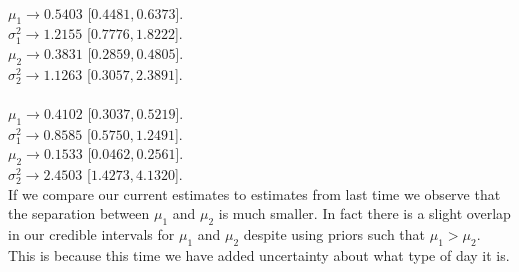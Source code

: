 \documentclass{article}
\begin{document}
\pagebreak

\\
$\mu_1 \rightarrow 0.5403$ [$0.4481  ,  0.6373$].\\
$\sigma_1^2 \rightarrow  1.2155$ [$0.7776 ,   1.8222$].\\
$\mu_2 \rightarrow  0.3831$ [$0.2859   , 0.4805$].\\
$\sigma_2^2 \rightarrow 1.1263$ [$0.3057 ,   2.3891$].\\

\\
$\mu_1 \rightarrow 0.4102$ [$0.3037,0.5219$].\\
$\sigma_1^2 \rightarrow  0.8585$ [$0.5750,1.2491$].\\
$\mu_2 \rightarrow  0.1533$ [$0.0462,0.2561$].\\
$\sigma_2^2 \rightarrow 2.4503$ [$1.4273,4.1320$].\\

If we compare our current estimates to estimates from last time we observe that the separation between $\mu_1$ and $\mu_2$ is much smaller. In fact there is a slight overlap in our credible intervals for $\mu_1$ and $\mu_2$ despite using priors such that $\mu_1 > \mu_2.$ This is because this time we have added uncertainty about what type of day it is. 

\pagebreak
{}\\

\end{document}
